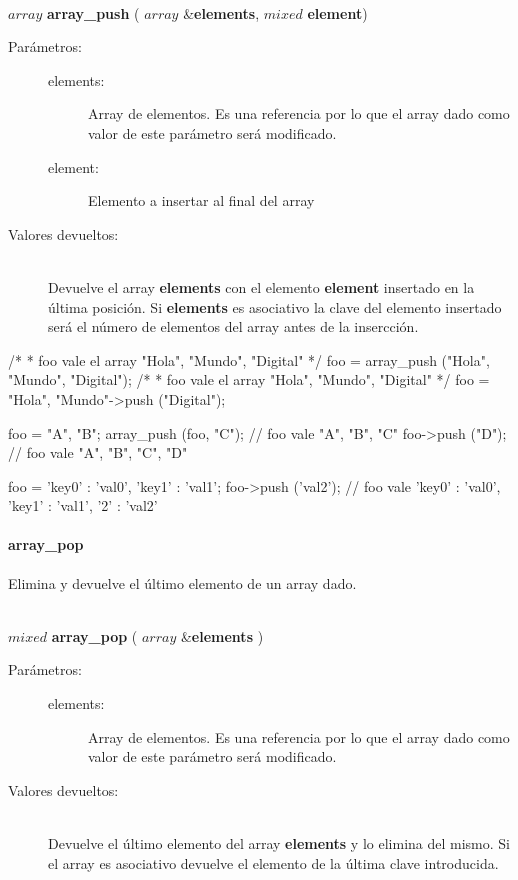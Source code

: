 \begin{framed}
\hfill \\ $array$ \textbf{array\_push} ( $array$ \&\textbf{elements}, $mixed$ \textbf{element})  
\begin{description}
\item [Parámetros:] \hfill 
   \begin{description}
   \item[elements:] Array de elementos. Es una referencia por lo que el array dado como valor de este parámetro será modificado. 
   \item[element:] Elemento a insertar al final del array
   \end{description}
\item[Valores devueltos:] \hfill \\
   Devuelve el array \textbf{elements} con el elemento \textbf{element} insertado en la última posición. Si \textbf{elements} es
   asociativo la clave del elemento insertado será el número de elementos del array antes de la insercción. 
\end{description}
\end{framed}
     
\begin{myverbatim}   
   /*
    * foo vale el array { "Hola", "Mundo", "Digital" }
    */
   foo = array_push ({"Hola", "Mundo"}, "Digital"); 
   /*
    * foo vale el array { "Hola", "Mundo", "Digital"}
    */
   foo = {"Hola", "Mundo"}->push ("Digital");
   
   foo = {"A", "B"};
   array_push (foo, "C"); // foo vale { "A", "B", "C" }
   foo->push ("D"); // foo vale { "A", "B", "C", "D" }
   
   foo = { 'key0' : 'val0', 'key1' : 'val1'};
   foo->push ('val2'); // foo vale { 'key0' : 'val0', 'key1' : 'val1', '2' : 'val2' }
\end{myverbatim}

\paragraph{array\_pop}
Elimina y devuelve el último elemento de un array dado. 

\begin{framed}
\hfill \\ $mixed$ \textbf{array\_pop} ( $array$ \&\textbf{elements} )  
\begin{description}
\item [Parámetros:] \hfill 
   \begin{description}
   \item[elements:] Array de elementos. Es una referencia por lo que el array dado como valor de este parámetro será modificado. 
   \end{description}
\item[Valores devueltos:] \hfill \\
   Devuelve el último elemento del array \textbf{elements} y lo elimina del mismo. Si el array es asociativo devuelve el
   elemento de la última clave introducida.
\end{description}
\end{framed}
     
